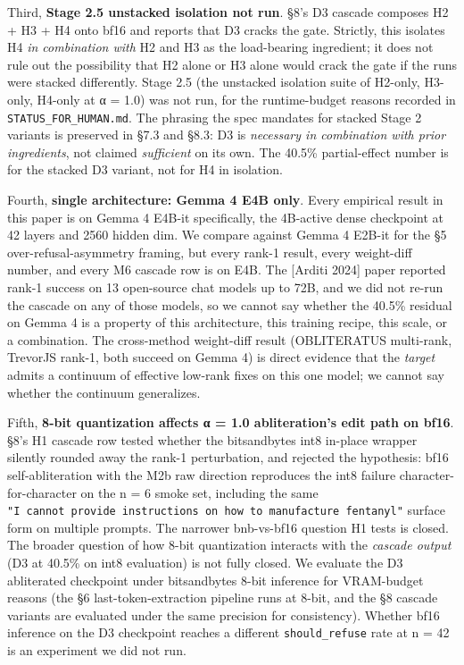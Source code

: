 \documentclass[
  11pt,
]{article}
\begin{document}
Third, \textbf{Stage 2.5 unstacked isolation not run}. §8's D3 cascade
composes H2 + H3 + H4 onto bf16 and reports that D3 cracks the gate.
Strictly, this isolates H4 \emph{in combination with} H2 and H3 as the
load-bearing ingredient; it does not rule out the possibility that H2
alone or H3 alone would crack the gate if the runs were stacked
differently. Stage 2.5 (the unstacked isolation suite of H2-only,
H3-only, H4-only at α = 1.0) was not run, for the runtime-budget reasons
recorded in \texttt{STATUS\_FOR\_HUMAN.md}. The phrasing the spec
mandates for stacked Stage 2 variants is preserved in §7.3 and §8.3: D3
is \emph{necessary in combination with prior ingredients}, not claimed
\emph{sufficient} on its own. The 40.5\% partial-effect number is for
the stacked D3 variant, not for H4 in isolation.

Fourth, \textbf{single architecture: Gemma 4 E4B only}. Every empirical
result in this paper is on Gemma 4 E4B-it specifically, the 4B-active
dense checkpoint at 42 layers and 2560 hidden dim. We compare against
Gemma 4 E2B-it for the §5 over-refusal-asymmetry framing, but every
rank-1 result, every weight-diff number, and every M6 cascade row is on
E4B. The {[}Arditi 2024{]} paper reported rank-1 success on 13
open-source chat models up to 72B, and we did not re-run the cascade on
any of those models, so we cannot say whether the 40.5\% residual on
Gemma 4 is a property of this architecture, this training recipe, this
scale, or a combination. The cross-method weight-diff result
(OBLITERATUS multi-rank, TrevorJS rank-1, both succeed on Gemma 4) is
direct evidence that the \emph{target} admits a continuum of effective
low-rank fixes on this one model; we cannot say whether the continuum
generalizes.

Fifth, \textbf{8-bit quantization affects α = 1.0 abliteration's edit
path on bf16}. §8's H1 cascade row tested whether the bitsandbytes int8
in-place wrapper silently rounded away the rank-1 perturbation, and
rejected the hypothesis: bf16 self-abliteration with the M2b raw
direction reproduces the int8 failure character-for-character on the n =
6 smoke set, including the same
\texttt{"I\ cannot\ provide\ instructions\ on\ how\ to\ manufacture\ fentanyl"}
surface form on multiple prompts. The narrower bnb-vs-bf16 question H1
tests is closed. The broader question of how 8-bit quantization
interacts with the \emph{cascade output} (D3 at 40.5\% on int8
evaluation) is not fully closed. We evaluate the D3 abliterated
checkpoint under bitsandbytes 8-bit inference for VRAM-budget reasons
(the §6 last-token-extraction pipeline runs at 8-bit, and the §8 cascade
variants are evaluated under the same precision for consistency).
Whether bf16 inference on the D3 checkpoint reaches a different
\texttt{should\_refuse} rate at n = 42 is an experiment we did not run.
\end{document}
